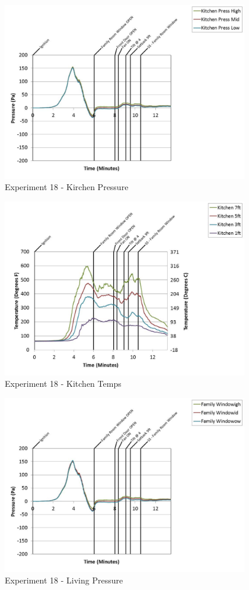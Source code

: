 \documentclass{article}
\begin{document}
\begin{appendices}
	\clearpage

	\begin{figure}[h!]
		\centering
		\includegraphics[height=3.05in]{0_Images/Results_Charts/Exp_18_Charts/KirchenPressure.pdf}
		\caption{Experiment 18 - Kirchen Pressure}
	\end{figure}
 

	\begin{figure}[h!]
		\centering
		\includegraphics[height=3.05in]{0_Images/Results_Charts/Exp_18_Charts/KitchenTemps.pdf}
		\caption{Experiment 18 - Kitchen Temps}
	\end{figure}
 
	\clearpage

	\begin{figure}[h!]
		\centering
		\includegraphics[height=3.05in]{0_Images/Results_Charts/Exp_18_Charts/LivingPressure.pdf}
		\caption{Experiment 18 - Living Pressure}
	\end{figure}
 


\end{appendices}
\end{document}

